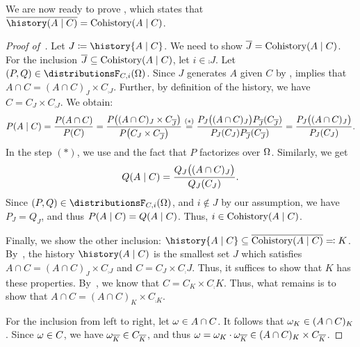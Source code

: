 \documentclass[USenglish,onecolumn]{article}
\begin{document}
We are now ready to prove , which states that $\comp{\history(A\given C)}=\historyC(A\given C)$.
\begin{proof}[Proof of~]
  \label{proof:cohistory_is_complement}
  Let $J \coloneqq \history{A \given C}$.
  We need to show ${\overline{J}} = \operatorname{Cohistory}(A \mid C)$.
  For the inclusion ${\overline{J}} \subseteq \operatorname{Cohistory}(A \mid C)$, let $i \in \comp{J}$.
  Let $(P, Q) \in \distributionsF_{C, i}(\Omg)$.
  Since $J$ generates $A$ given $C$ by ,  implies that $A \cap C = (A \cap C)_J \times C_{\comp{J}}$. Further, by definition of the history, we have $C = C_J \times C_{\comp{J}}$.
  We obtain:
  \begin{align*}
    P(A \mid C) = \frac{P(A \cap C)}{P(C)}
    = \frac{P\big( (A \cap C)_J \times C_{{\overline{J}}} \big)}{P\big(C_J \times C_{{\overline{J}}}\big)}
    \overset{(*)}{=} \frac{P_J\big( (A \cap C)_J \big)  P_{{\overline{J}}}(C_{{\overline{J}}})}{P_J(C_J)  P_{{\overline{J}}}(C_{{\overline{J}}})} = \frac{P_J\big( (A \cap C)_J \big)}{P_J(C_J)}.
  \end{align*}
  In the step $(*)$, we use  and the fact that $P$ factorizes over $\Omega$.
  Similarly, we get
  \begin{equation*}
    Q(A \mid C) = \frac{Q_J\big( (A \cap C)_J \big)}{Q_J(C_J)}.
  \end{equation*}
  Since $(P, Q) \in \distributionsF_{C, i}(\Omg)$, and $i \notin J$ by our assumption, we have $P_J = Q_J$, and thus $P(A \mid C) = Q(A \mid C)$.
  Thus, $i \in \operatorname{Cohistory}(A \mid C)$.

  Finally, we show the other inclusion: $\history{A \given C} \subseteq \comp{\historyC(A \given C)} \eqqcolon K$. 
By~, the history $\history(A \given C)$ is the smallest set $J$ which satisfies $A \cap C = (A \cap C)_J \times C_{\comp{J}}$ and $C=C_J\times C_\comp{J}$.
  Thus, it suffices to show that $K$ has these properties.
  By~, we know that $C=C_K\times C_\comp{K}$.
  Thus, what remains is to show that $A \cap C = (A \cap C)_K \times C_{\comp{K}}$.

  For the inclusion from left to right,
  let $\omega\in A\cap C$. It follows that $\omega_K\in (A\cap C)_K$. Since $\omega \in C$, we have $\omega_{\overline{K}}\in C_{\overline{K}}$, and thus $\omega =\omega_K\cdot \omega_{\overline{K}} \in (A \cap C)_K \times C_{{\overline{K}}}$.


\end{proof}
\end{document}

